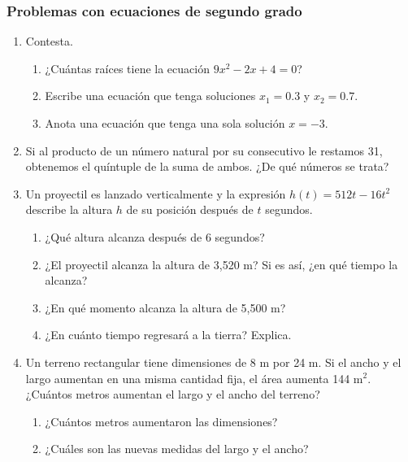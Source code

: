\documentclass[11pt]{book}
\begin{document}
\newpage

\subsubsection{Problemas con ecuaciones de segundo grado}

\begin{enumerate}
    \item Contesta.
          \begin{enumerate}
              \item ¿Cuántas raíces tiene la ecuación $9x^2 - 2x + 4 = 0$?
              \item Escribe una ecuación que tenga soluciones $x_1 = 0.3$ y $x_2 = 0.7$.
              \item Anota una ecuación que tenga una sola solución $x = -3$.
          \end{enumerate}

    \item Si al producto de un número natural por su consecutivo le restamos 31, obtenemos
          el quíntuple de la suma de ambos. ¿De qué números se trata?

    \item Un proyectil es lanzado verticalmente y la expresión $h(t) = 512t - 16t^2$ describe la
          altura $h$ de su posición después de $t$ segundos.
          \begin{enumerate}
              \item ¿Qué altura alcanza después de 6 segundos?
              \item ¿El proyectil alcanza la altura de 3,520 m? Si es así, ¿en qué tiempo la alcanza?
              \item ¿En qué momento alcanza la altura de 5,500 m?
              \item ¿En cuánto tiempo regresará a la tierra? Explica.

          \end{enumerate}

    \item Un terreno rectangular tiene dimensiones de 8 m por 24 m. Si el ancho y el largo
          aumentan en una misma cantidad fija, el área aumenta 144 m$^2$. ¿Cuántos metros
          aumentan el largo y el ancho del terreno?
          \begin{enumerate}
              \item ¿Cuántos metros aumentaron las dimensiones?
              \item ¿Cuáles son las nuevas medidas del largo y el ancho?
          \end{enumerate}


\end{enumerate}
\end{document}
